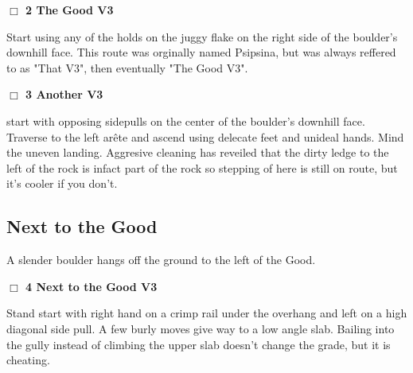 	\begin{multicols}{2}


\needspace{2em}
\label{rt:The Good}
\colorbox{green!20}{
\parbox{0.95\linewidth}{
\hspace{-1ex}\textbf{$\Box$
2 The Good V3  
}}}
\begin{adjustwidth}{1.3em}{}			

Start using any of the holds on the juggy flake on the right side of the boulder's downhill face. This route was orginally named Psipsina, but was always reffered to as "That V3", then eventually "The Good V3".
\end{adjustwidth}




\needspace{2em}
\label{rt:Another}
\colorbox{green!20}{
\parbox{0.95\linewidth}{
\hspace{-1ex}\textbf{$\Box$
3 Another V3  \warn
}}}
\begin{adjustwidth}{1.3em}{}			

start with opposing sidepulls on the center of the boulder's downhill face. Traverse to the left arête and ascend using delecate feet and unideal hands. Mind the uneven landing. Aggresive cleaning has reveiled that the dirty ledge to the left of the rock is infact part of the rock so stepping of here is still on route, but it's cooler if you don't.
\end{adjustwidth}





\needspace{10em}
\subsection*{Next to the Good}\label{bf:Next to the Good}

A slender boulder hangs off the ground to the left of the Good.\\



\needspace{2em}
\label{rt:Next to the Good}
\colorbox{green!20}{
\parbox{0.95\linewidth}{
\hspace{-1ex}\textbf{$\Box$
4 Next to the Good V3  \warn
}}}
\begin{adjustwidth}{1.3em}{}			

Stand start with right hand on a crimp rail under the overhang and left on a high diagonal side pull. A few burly moves give way to a low angle slab. Bailing into the gully instead of climbing the upper slab doesn't change the grade, but it is cheating.
\end{adjustwidth}





\end{multicols}
